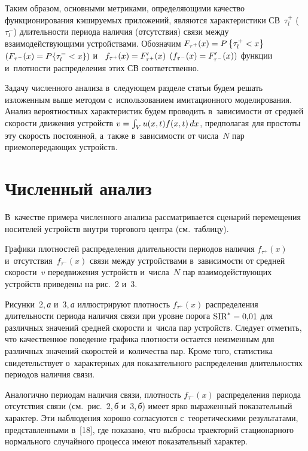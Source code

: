 \begin{multicols}{2}
  Таким образом, основными метриками, определяющими качество 
функционирования кэширу\-емых приложений, являются характеристики 
СВ~$\tau_l^+$ ($\tau_l^-$) длительности периода наличия (отсутствия) связи 
между взаимодействующими устройствами. Обозначим $F_{\tau^+}(x)\hm= 
P\left\{ \tau_l^+<x\right\}$ $(F_{\tau^-}(x)\hm= P\{ \tau_l^-<x\})$ и~
$f_{\tau^+}(x)\hm= F^\prime_{\tau^+}(x)$ $(f_{\tau^-}(x)\hm= F^\prime_{\tau^-
}(x))$ функции и~плотности распределения этих СВ соответственно.
  
  Задачу численного анализа в~следующем разделе статьи будем решать 
изложенным выше методом с~использованием имитационного моделирования. 
Анализ вероятностных характеристик будем проводить в~зависимости от 
средней скорости движения устройств $v\hm= \int\nolimits_V u(x,t)f(x,t)\,dx$, 
предполагая для простоты эту скорость постоянной, а~также в~зависимости от 
числа~$N$ пар при\-емо\-пе\-ре\-да\-ющих устройств.

\vspace*{-8pt}

\section{Численный анализ}

\vspace*{-2pt}

  В~качестве примера численного анализа рассматривается сценарий 
перемещения носителей устройств внутри торгового центра (см.\ таблицу).
  

  Графики плотностей распределения длитель\-ности периодов наличия 
$f_{\tau^+}(x)$ и~отсутствия~$f_{\tau^-}(x)$ связи между устройствами 
в~зависимости от средней скорости~$v$ передвижения устройств и~числа~$N$ 
пар взаимодействующих устройств приведены на рис.~2 и~3.
  
  Рисунки~2,\,\textit{а} и~3,\,\textit{а} иллюстрируют плотность 
$f_{\tau^+}(x)$ распределения длительности периода наличия связи при уровне 
порога $\mathrm{SIR}^*\hm=0{,}01$ для различных значений средней скорости и~числа пар устройств. Следует отметить, что качественное поведение графика 
плотности остается неизменным для различных значений скоростей 
и~количества пар. Кроме того, статистика свидетельствует о~характерных для 
показательного распределения длительностях периодов наличия связи.
  


  Аналогично периодам наличия связи, плотность $f_{\tau^-}(x)$ 
распределения периода отсутствия связи (см.\ рис.~2,\,\textit{б} и~3,\,\textit{б}) 
имеет ярко выраженный показательный характер. Эти наблюдения хорошо 
согласуются с~теоретическими результатами, представленными в~[18], где 
показано, что выбросы траекторий стационарного нормального случайного 
процесса имеют показательный характер.



\end{multicols}
